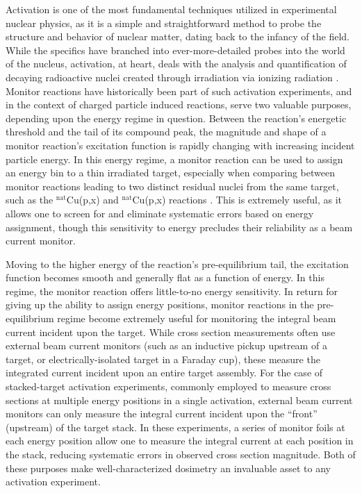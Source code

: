 \documentclass[3p]{elsarticle}
\begin{document}
Activation is one of the most fundamental techniques utilized in experimental nuclear physics, as it is a simple and straightforward method to probe the structure and behavior of nuclear matter,  dating back to the infancy of the field. 
While the specifics have branched into ever-more-detailed probes into the world of the nucleus, activation, at heart, deals with the analysis and quantification of decaying radioactive nuclei created through irradiation via ionizing radiation \cite{ehmann1993radiochemistry,krüger1971principles}.
Monitor reactions have  historically been part of such activation experiments, and in the context of charged particle induced reactions, serve two valuable purposes, depending upon the energy regime in question.  
Between the reaction's energetic threshold  and the tail of its compound peak, the magnitude and shape of a monitor reaction's excitation function is rapidly changing with increasing incident particle energy.
In this energy regime, a monitor reaction can be used to assign an energy bin to a thin irradiated target, especially when comparing between monitor reactions leading to two distinct residual nuclei from the same target, such as the $^\text{nat}$Cu(p,x) and $^\text{nat}$Cu(p,x) reactions \cite{gul2001charged}.
This is extremely useful, as it allows one to screen for and eliminate systematic errors based on energy assignment, though this sensitivity to energy precludes their reliability as a beam current monitor.  

Moving to the higher energy  of the reaction's pre-equilibrium tail, the excitation function becomes  smooth and generally flat as a function of energy.
In this regime, the monitor reaction offers little-to-no energy sensitivity. 
In return for giving up the ability to assign energy positions, monitor reactions in the pre-equilibrium regime become extremely useful for monitoring the integral beam current incident upon the target. 
While cross section measurements often use external beam current monitors (such as an inductive pickup upstream of a target, or electrically-isolated target in a Faraday cup), these measure the integrated current incident upon an entire target assembly.
For the case of stacked-target activation experiments, commonly employed to measure cross sections at multiple energy positions in a single activation, external beam current monitors can only measure the integral current incident upon the \enquote{front} (upstream) of the target stack.
In these experiments, a series of monitor foils at each energy position allow one to measure the integral current at each position in the stack, reducing systematic errors in observed cross section magnitude.
Both of these purposes make well-characterized dosimetry an invaluable asset to any activation experiment. 
\end{document}
